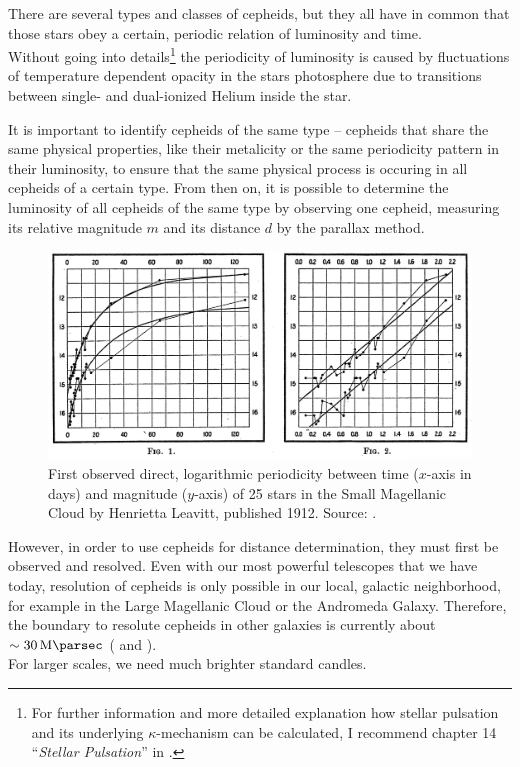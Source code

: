 There are several types and classes of cepheids, but they all have in common that those stars obey a certain, periodic relation of luminosity and time. \\

\noindent Without going into details\footnote{For further information and more detailed explanation how stellar pulsation and its underlying $\kappa$-mechanism can be calculated, I recommend chapter 14 ``\textit{Stellar Pulsation}'' in \cite{BradleyCarroll2007}.} the periodicity of luminosity is caused by fluctuations of temperature dependent opacity in the stars photosphere due to transitions between single- and dual-ionized Helium inside the star. 

\noindent It is important to identify cepheids of the same type -- cepheids that share the same physical properties, like their metalicity or the same periodicity pattern in their luminosity, to ensure that the same physical process is occuring in all cepheids of a certain type.
\noindent From then on, it is possible to determine the luminosity of all cepheids of the same type by observing one cepheid, measuring its relative magnitude $m$ and its distance $d$ by the parallax method. \\

\begin{figure}[H]
    \centering
    \includegraphics[scale=0.3]{figures/images/leavitt_period-luminosity.png}
    \caption{First observed direct, logarithmic periodicity between time ($x$-axis in days) and magnitude ($y$-axis) of 25 stars in the Small Magellanic Cloud by Henrietta Leavitt, published 1912. Source: \cite{Leavitt1912}.}
\end{figure}


\noindent However, in order to use cepheids for distance determination, they must first be observed and resolved.
Even with our most powerful telescopes that we have today, resolution of cepheids is only possible in our local, galactic neighborhood, for example in the Large Magellanic Cloud or the Andromeda Galaxy. Therefore, the boundary to resolute cepheids in other galaxies is currently about $\sim \SI{30}{\mega \parsec}$ (\cite[p.~47]{Bartelmann2019} and \cite[p.~3]{Engelmann2013}). \\
For larger scales, we need much brighter standard candles.



